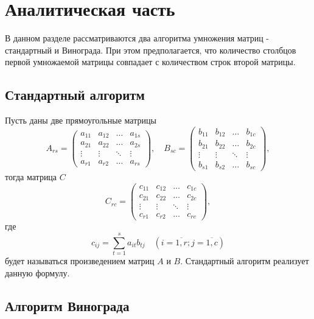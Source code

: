 \documentclass[12pt]{report}
\begin{document}
\chapter{Аналитическая часть}
В данном разделе рассматриваются два алгоритма умножения матриц - стандартный и Винограда. При этом предполагается, что количество столбцов первой умножаемой матрицы совпадает с количеством строк второй матрицы.
\section{Стандартный алгоритм}

Пусть даны две прямоугольные матрицы
\begin{equation}
	A_{rs} = \begin{pmatrix}
		a_{11} & a_{12} & \ldots & a_{1s}\\
		a_{21} & a_{22} & \ldots & a_{2s}\\
		\vdots & \vdots & \ddots & \vdots\\
		a_{r1} & a_{r2} & \ldots & a_{rs}
	\end{pmatrix},
	\quad
		B_{sc} = \begin{pmatrix}
		b_{11} & b_{12} & \ldots & b_{1c}\\
		b_{21} & b_{22} & \ldots & b_{2c}\\
		\vdots & \vdots & \ddots & \vdots\\
		b_{s1} & b_{s2} & \ldots & b_{sc}
	\end{pmatrix},
\end{equation}
тогда матрица $C$
\begin{equation}
	C_{rc} = \begin{pmatrix}
		c_{11} & c_{12} & \ldots & c_{1c}\\
		c_{21} & c_{22} & \ldots & c_{2c}\\
		\vdots & \vdots & \ddots & \vdots\\
		c_{r1} & c_{r2} & \ldots & c_{rc}
	\end{pmatrix},
\end{equation}
где
\begin{equation}
	\label{eq:M}
	c_{ij} =
		\sum_{t=1}^{s} a_{it}b_{tj} \quad (i=\overline{1,r}; j=\overline{1,c})
\end{equation}
будет называться произведением матриц $A$ и $B$. Стандартный алгоритм реализует данную формулу.

\section{Алгоритм Винограда}
\end{document}
